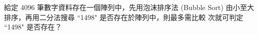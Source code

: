 \ifx\ntpcNinetyThree\undefined[93學年基北區] \fi
\label{ntpc-93-p37} 給定 4096 筆數字資料存在一個陣列中，先用泡沫排序法 (Bubble Sort) 由小至大排序，再用二分法搜尋 ``1498" 是否存在於陣列中，則最多需比較 \underlineblank{\ref{ntpc-93-p37}} 次就可判定 ``1498" 是否存在？